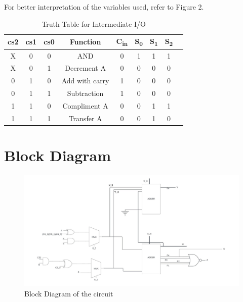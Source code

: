 \documentclass{article}
\begin{document}
For better interpretation of the variables used, refer to Figure 2.

\begin{table}[h!]
    \centering
    \begin{tabular}{|c|c|c|c|c|c|c|c|c|}
        \hline
        \textbf{cs2} & \textbf{cs1} & \textbf{cs0} & \textbf{Function} & \textbf{C\textsubscript{in}} & \textbf{S\textsubscript{0}} & \textbf{S\textsubscript{1}} & \textbf{S\textsubscript{2}} \\
        \hline
        X & 0 & 0 & AND             & 0 & 1 & 1 & 1 \\
        X & 0 & 1 & Decrement A     & 0 & 0 & 0 & 0 \\
        0 & 1 & 0 & Add with carry  & 1 & 0 & 0 & 0 \\
        0 & 1 & 1 & Subtraction     & 1 & 0 & 0 & 0 \\
        1 & 1 & 0 & Compliment A    & 0 & 0 & 1 & 1 \\
        1 & 1 & 1 & Transfer A      & 0 & 0 & 1 & 0 \\
        \hline
    \end{tabular}
    \caption{Truth Table for Intermediate I/O}
\end{table}      
\section{Block Diagram}
\begin{figure}[h!]

\includegraphics[width=1\textwidth]{Blank diagram (1).jpeg} %
\caption{ Block Diagram of the circuit}
\label{fig-2}
\end{figure}
\pagebreak
\end{document}

